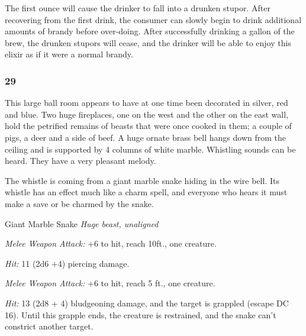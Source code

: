 \documentclass[palace_of_the_silver_princess]{subfiles}
\begin{document}
The first ounce will cause the drinker to fall into a drunken stupor.
After recovering from the first drink, the consumer can slowly begin to
drink additional amounts of brandy before over-doing. After
successfully drinking a gallon of the brew, the drunken stupors will
cease, and the drinker will be able to enjoy this elixir as if it were a
normal brandy.

\subsubsection{29}
\begin{quotebox}
    This large ball room appears to have at one time been decorated in
    silver, red and blue. Two huge fireplaces, one on the west and the
    other on the east wall, hold the petrified remains of beasts that
    were once cooked in them; a couple of pigs, a deer and a side of
    beef. A huge ornate brass bell hangs down from the ceiling and is
    supported by 4 columns of white marble. Whistling sounds can be
    heard. They have a very pleasant melody.
\end{quotebox}

The whistle is coming from a giant marble snake hiding in the wire bell.
Its whistle has an effect much like a charm spell, and everyone who
hears it must make a save or be charmed by the snake.

\begin{monsterbox}{Giant Marble Snake}
	\textit{Huge beast, unaligned}\\
	\hline
	\basics[
		armorclass = {12},
		hitpoints = {60 (8d12 + 8)},
		speed = {30~ft., swim 30~ft.}]
	\hline
	\stats[
		STR = \stat{19},
		DEX = \stat{14},
		CON = \stat{12},
		INT = \stat{1},
		WIS = \stat{10},
		CHA = \stat{3}]
	\hline
	\details[
        skills = {Perception +2},
		senses = {blindsight 10~ft.passive Perception 12},
        languages = {---},
		challenge = {2 (450 XP)}]
	\hline

    \begin{monsteraction}[Bite]
		\textit{Melee Weapon Attack:} +6 to hit, reach 10ft., one
        creature.

        \textit{Hit:} 11 (2d6 +4) piercing damage.
	\end{monsteraction}

    \begin{monsteraction}[Constrict]
        \textit{Melee Weapon Attack:} +6 to hit, reach 5 ft., one
        creature. 

        \textit{Hit:} 13 (2d8 + 4) bludgeoning damage, and the target is
        grappled (escape DC 16). Until this grapple ends, the creature
        is restrained, and the snake can't constrict another target.
    \end{monsteraction}
\end{monsterbox}
\end{document}
